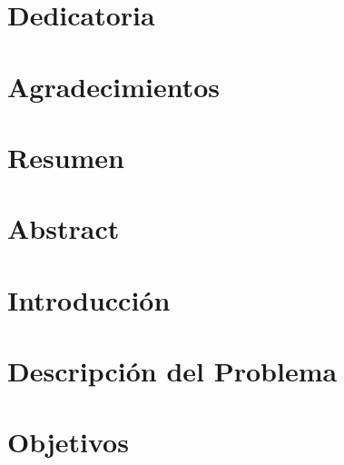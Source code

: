 \documentclass{thesis-tg-ie-pujc} %
\begin{document}
\maketitle
\makecoverletter

\chapter*{Dedicatoria}


\chapter*{Agradecimientos }


\chapter*{Resumen}


\chapter*{Abstract}



\tableofcontents
\listoffigures


\dominitoc
\mainmatter

\chapter{Introducción}


\chapter{Descripción del Problema}


\chapter{Objetivos}

\end{document}
